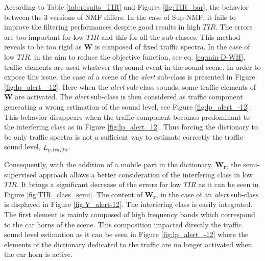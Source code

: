\documentclass[twocolumn,a4paper,10pt]{article}
\begin{document}
According to Table \ref{tab:results_TIR} and Figures \ref{fig:TIR_bar}, the behavior between the 3 versions of NMF differs. In the case of Sup-NMF, it fails to improve the filtering performances despite good results in high $TIR$. The errors are too important for low $TIR$ and this for all the sub-classes. This method reveals to be too rigid as $\mathbf{W}$ is composed of fixed traffic spectra. In the case of low $TIR$, in the aim to reduce the objective function, see eq. \ref{eq:min-D-WH}, traffic elements are used whatever the sound event in the  sound scene. In order to expose this issue, the case of a scene of the \textit{alert} sub-class is presented in Figure \ref{fig:lp_alert_-12}. Here when the \textit{alert} sub-class sounds, some traffic elements of $\mathbf{W}$ are activated. The \textit{alert} sub-class is then considered as traffic component generating a wrong estimation of the sound level, see Figure \ref{fig:lp_alert_-12}. This behavior disappears when the traffic component becomes predominant to the interfering class as in Figure \ref{fig:lp_alert_12}. Thus forcing the dictionary to be only traffic spectra is not a sufficient way to estimate correctly the traffic sound level, $\tilde{L}_{p,traffic}$.

Consequently, with the addition of a mobile part in the dictionary, $\mathbf{W_r}$, the semi-supervised approach  allows a better consideration of the interfering class in low $TIR$. It brings a significant decrease of the errors for low $TIR$ as it can be seen in Figure \ref{fig:TIR_class_semi}. The content of $\mathbf{W_r}$, in the case of an \textit{alert} sub-class is displayed in Figure \ref{fig:Y_alert-12}. The interfering class is easily integrated. The first element is mainly composed of high frequency bands which correspond to the car horns of the scene. This composition impacted directly the traffic sound level estimation as it can be seen in Figure \ref{fig:lp_alert_-12} where the elements of the dictionary dedicated to the traffic are no longer activated when the car horn is active.
\end{document}
